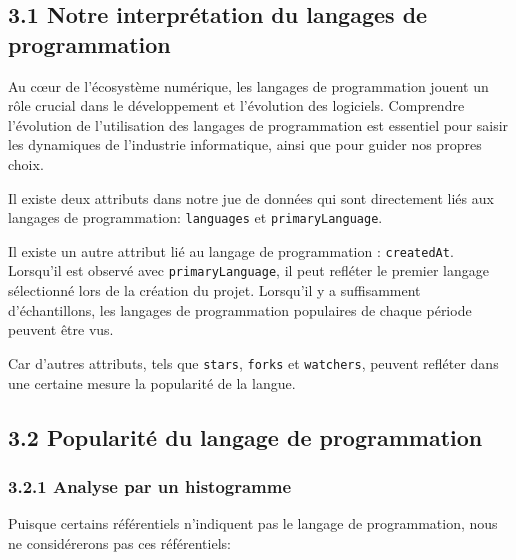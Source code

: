 \documentclass[
]{article}
\newenvironment{Shaded}{\begin{snugshade}}{\end{snugshade}}
\newcommand{\DecValTok}[1]{\textcolor[rgb]{0.00,0.00,0.81}{#1}}
\newcommand{\NormalTok}[1]{#1}
\newcommand{\OtherTok}[1]{\textcolor[rgb]{0.56,0.35,0.01}{#1}}
\newcommand{\SpecialCharTok}[1]{\textcolor[rgb]{0.81,0.36,0.00}{\textbf{#1}}}
\begin{document}
\subsection{3.1 Notre interprétation du langages de
programmation}\label{notre-interpruxe9tation-du-langages-de-programmation}

Au cœur de l'écosystème numérique, les langages de programmation jouent
un rôle crucial dans le développement et l'évolution des logiciels.
Comprendre l'évolution de l'utilisation des langages de programmation
est essentiel pour saisir les dynamiques de l'industrie informatique,
ainsi que pour guider nos propres choix.

Il existe deux attributs dans notre jue de données qui sont directement
liés aux langages de programmation: \texttt{languages} et
\texttt{primaryLanguage}.

Il existe un autre attribut lié au langage de programmation :
\texttt{createdAt}. Lorsqu'il est observé avec \texttt{primaryLanguage},
il peut refléter le premier langage sélectionné lors de la création du
projet. Lorsqu'il y a suffisamment d'échantillons, les langages de
programmation populaires de chaque période peuvent être vus.

Car d'autres attributs, tels que \texttt{stars}, \texttt{forks} et
\texttt{watchers}, peuvent refléter dans une certaine mesure la
popularité de la langue.

\subsection{3.2 Popularité du langage de
programmation}\label{popularituxe9-du-langage-de-programmation}

\subsubsection{3.2.1 Analyse par un
histogramme}\label{analyse-par-un-histogramme}

Puisque certains référentiels n'indiquent pas le langage de
programmation, nous ne considérerons pas ces référentiels:

\begin{Shaded}
\end{Shaded}
\end{document}
